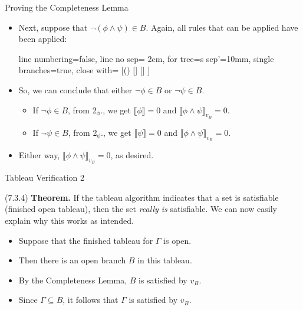 \begin{frame}{Proving the Completeness Lemma}

\begin{itemize}
\itemsep=16pt

		
		\item Next, suppose that $\neg (\phi\land \psi)\in B$. Again, all rules that can be applied have been applied:
		\begin{center}
				\begin{prooftree}
					{
					line numbering=false,
					line no sep= 2cm,
					for tree={s sep'=10mm},
					single branches=true,
					close with=\xmark
					}
					[\neg(\phi\land\psi) [\neg\phi ] [\neg\psi ] ]
					\end{prooftree}
				\end{center}
		
		\item So, we can conclude that either $\neg\phi\in B$ or $\neg\psi\in B$.	
		\medskip
		
		\begin{itemize}
		
		\item If $\neg\phi\in B$, from 2$_\phi$., we get $\llbracket \phi\rrbracket=0$ and $\llbracket\phi\land \psi\rrbracket_{v_B}=0$.
		

		\item If $\neg\psi\in B$, from 2$_\phi$., we get $\llbracket \psi\rrbracket=0$ and $\llbracket\phi\land \psi\rrbracket_{v_B}=0$.
		
		\end{itemize}
						
	\item Either way,  $\llbracket\phi\land \psi\rrbracket_{v_B}=0$, as desired.
	
	\end{itemize}

\end{frame}


\begin{frame}{Tableau Verification 2}

(7.3.4) \textbf{Theorem.} If the tableau algorithm indicates that a set is satisfiable (finished open tableau), then the set \emph{really is} satisfiable. 
We can now easily explain why this works as intended.
	
\bigskip

\begin{itemize}
\itemsep=16pt
	
		\item Suppose that the finished tableau for $\Gamma$ is open.
		
		\item Then there is an open branch $B$ in this tableau.
	
		\item By the Completeness Lemma, $B$ is satisfied by $v_B$.
		
		\item Since $\Gamma\subseteq B$, it follows that $\Gamma$ is satisfied by $v_B$.
	
	\end{itemize}

\end{frame}



